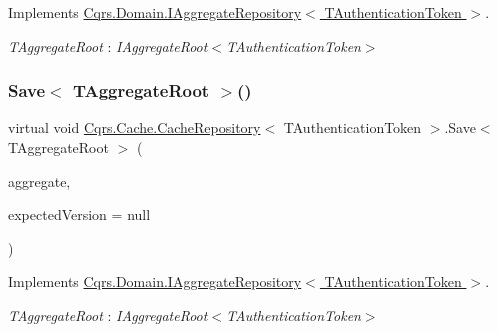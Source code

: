 Implements \hyperlink{interfaceCqrs_1_1Domain_1_1IAggregateRepository_a890633fddbd05bd3b9e9968a2de095bb}{Cqrs.\+Domain.\+I\+Aggregate\+Repository$<$ T\+Authentication\+Token $>$}.

\begin{Desc}
\item[Type Constraints]\begin{description}
\item[{\em T\+Aggregate\+Root} : {\em I\+Aggregate\+Root$<$T\+Authentication\+Token$>$}]\end{description}
\end{Desc}
\mbox{\label{classCqrs_1_1Cache_1_1CacheRepository_a69df7ee1dc2e4cd38431ab987655eab3}} 
\subsubsection{\texorpdfstring{Save$<$ T\+Aggregate\+Root $>$()}{Save< TAggregateRoot >()}}
{\footnotesize\ttfamily virtual void \hyperlink{classCqrs_1_1Cache_1_1CacheRepository}{Cqrs.\+Cache.\+Cache\+Repository}$<$ T\+Authentication\+Token $>$.Save$<$ T\+Aggregate\+Root $>$ (\begin{DoxyParamCaption}\item[{T\+Aggregate\+Root}]{aggregate,  }\item[{int?}]{expected\+Version = {\ttfamily null} }\end{DoxyParamCaption})\hspace{0.3cm}{\ttfamily [virtual]}}



Implements \hyperlink{interfaceCqrs_1_1Domain_1_1IAggregateRepository_a306baf8aa6faabe893f93e5db5d3517d}{Cqrs.\+Domain.\+I\+Aggregate\+Repository$<$ T\+Authentication\+Token $>$}.

\begin{Desc}
\item[Type Constraints]\begin{description}
\item[{\em T\+Aggregate\+Root} : {\em I\+Aggregate\+Root$<$T\+Authentication\+Token$>$}]\end{description}
\end{Desc}

